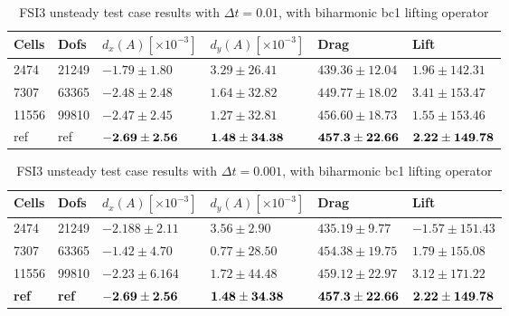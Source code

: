 \begin{table}[H]
\centering
\caption{FSI3 unsteady test case results with $\Delta t = 0.01$, with biharmonic bc1 lifting operator}
\label{tab:FSI3_001}
\begin{tabular}{|l|l|l|l|l|l|}
\hline
Cells & Dofs & $d_x (A)[\times10^{-3} ]$ & $d_y (A)[\times10^{-3} ]$ & Drag & Lift \\ \hline
2474 & 21249 & $-1.79 \pm 1.80$ & $3.29 \pm 26.41$ & $439.36 \pm 12.04$ & $1.96 \pm 142.31$ \\ \hline
7307 & 63365 & $-2.48 \pm 2.48$ & $ 1.64 \pm 32.82$ & $449.77 \pm 18.02$ & $3.41 \pm 153.47$ \\ \hline
11556 & 99810 & $ -2.47 \pm 2.45$ & $ 1.27 \pm 32.81$ & $456.60 \pm 18.73$ & $1.55 \pm 153.46$ \\ \hline
ref & ref & $\bold{-2.69 \pm  2.56}$ & $\bold{1.48 \pm 34.38}$ & $\bold{457.3 \pm 22.66}$ & $\bold{2.22 \pm 149.78}$ \\ \hline
\end{tabular}
\end{table}

\begin{table}[H]
\centering
\caption{FSI3 unsteady test case results with $\Delta t = 0.001$, with biharmonic bc1 lifting operator}
\label{tab:FSI3_0001}
\begin{tabular}{|l|l|l|l|l|l|}
\hline
Cells & Dofs & $d_x (A)[\times10^{-3} ]$ & $d_y (A)[\times10^{-3} ]$ & Drag & Lift \\ \hline
2474 & 21249 & $ -2.188 \pm 2.11 $ & $ 3.56 \pm 2.90 $ & $ 435.19 \pm 9.77$ & $ -1.57 \pm 151.43 $ \\ \hline
7307 & 63365 & $ -1.42 \pm 4.70 $ & $ 0.77 \pm 28.50 $ & $ 454.38 \pm 19.75 $ & $1.79 \pm 155.08 $ \\ \hline
11556 & 99810 & $ -2.23 \pm 6.164 $ & $ 1.72 \pm 44.48 $ & $ 459.12 \pm 22.97 $ & $ 3.12 \pm 171.22 $ \\ \hline
\textbf{ref} & \textbf{ref} & $\bold{-2.69} \pm \bold{2.56}$ & $\bold{1.48} \pm \bold{34.38}$ & $\bold{457.3} \pm \bold{22.66}$ & $\bold{2.22} \pm \bold{149.78}$ \\ \hline
\end{tabular}
\end{table}


